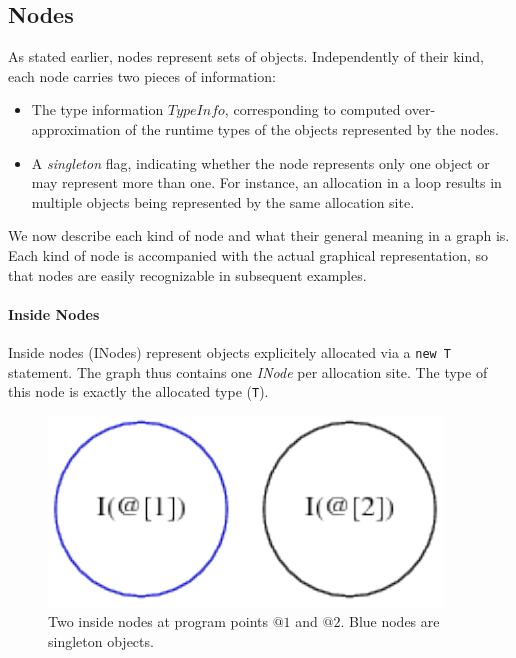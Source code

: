 \subsection{Nodes}
As stated earlier, nodes represent sets of objects. Independently of their
kind, each node carries two pieces of information:
\begin{itemize}
    \item The type information $TypeInfo$, corresponding to computed over-approximation of the runtime types
    of the objects represented by the nodes.
    \item A \emph{singleton} flag, indicating whether the node represents only
    one object or may represent more than one. For instance, an allocation in a
    loop results in multiple objects being represented by the same allocation site\cite{DBLP:conf/pldi/ChaseWZ90}.
\end{itemize}
We now describe each kind of node and what their general meaning in a
graph is. Each kind of node is accompanied with the actual graphical
representation, so that nodes are easily recognizable in subsequent examples.

\paragraph{Inside Nodes}
Inside nodes (INodes) represent objects explicitely allocated via a \verb=new T=
statement. The graph thus contains one \emph{INode} per allocation site.
The type of this node is exactly the allocated type (\verb=T=).
\begin{figure}[h]
    \centering

    \includegraphics{images/pt_inodes}

    \caption{Two inside nodes at program points $@1$ and $@2$. Blue nodes are
    singleton objects.}
    \label{fig:pt:inodes}
\end{figure}

